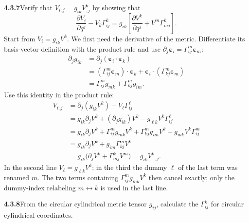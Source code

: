 \par\bigskip
\noindent\textbf{4.3.7}\quad Verify that $V_{i;j}=g_{ik}V^{k}_{;j}$ by showing
that
\[
\frac{\partial V_{i}}{\partial q^{j}}-V_{k}\Gamma_{ij}^{k}
=g_{ik}\left[\frac{\partial V^{k}}{\partial q^{j}}
+V^{m}\Gamma_{mj}^{k}\right].
\]
\solution
Start from $V_i=g_{ik}V^k$. We first need the derivative of the
metric. Differentiate its basis-vector definition with the product rule
and use
$\partial_j\boldsymbol\varepsilon_i=\Gamma^m_{ij}\boldsymbol\varepsilon_m$:
\begin{align*}
\partial_jg_{ik}
&=\partial_j(\boldsymbol\varepsilon_i\cdot\boldsymbol\varepsilon_k)\\
&=(\Gamma^m_{ij}\boldsymbol\varepsilon_m)
      \cdot\boldsymbol\varepsilon_k
 +\boldsymbol\varepsilon_i\cdot
      (\Gamma^m_{kj}\boldsymbol\varepsilon_m)\\
&=\Gamma^m_{ij}g_{mk}+\Gamma^m_{kj}g_{im}.
\end{align*}
Use this identity in the product rule:
\begin{align*}
V_{i;j}
&=\partial_j(g_{ik}V^k)-V_\ell\Gamma^\ell_{ij}\\
&=g_{ik}\partial_jV^k+(\partial_jg_{ik})V^k
       -g_{\ell k}V^k\Gamma^\ell_{ij}\\
&=g_{ik}\partial_jV^k
  +\Gamma^m_{ij}g_{mk}V^k
  +\Gamma^m_{kj}g_{im}V^k
  -g_{mk}V^k\Gamma^m_{ij}\\
&=g_{ik}\partial_jV^k+g_{im}\Gamma^m_{kj}V^k\\
&=g_{ik}\bigl(\partial_jV^k+\Gamma^k_{mj}V^m\bigr)
 =\boxed{g_{ik}V^k{}_{;j}}.
\end{align*}
In the second line $V_\ell=g_{\ell k}V^k$; in the third the dummy
$\ell$ of the last term was renamed $m$. The two terms containing
$\Gamma^m_{ij}g_{mk}V^k$ then cancel exactly; only the dummy-index
relabeling $m\leftrightarrow k$ is used in the last line.

\par\bigskip
\noindent\textbf{4.3.8}\quad From the circular cylindrical metric tensor
$g_{ij}$, calculate the $\Gamma_{ij}^{k}$ for circular cylindrical
coordinates.

